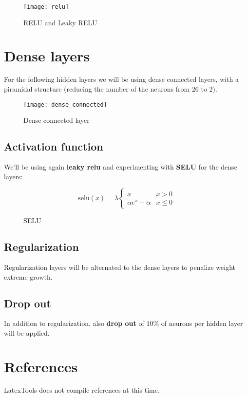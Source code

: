 \begin{figure}
	\texttt{[image: relu]}
	\caption{RELU and Leaky RELU}
\end{figure}

\chapter{Dense layers}
For the following hidden layers we will be using dense connected layers, with a piramidal structure (reducing the number of the neurons from 26 to 2).

\begin{figure}
	\texttt{[image: dense\_connected]}
	\caption{Dense connected layer}
\end{figure}

\section{Activation function}
We'll be using again \textbf{leaky relu} and experimenting with \textbf{SELU} for the dense layers:

\begin{figure}
	\[
		\text{selu}(x) = \lambda \begin{cases}
			x                 & x > 0    \\
			\alpha e^x-\alpha & x \leq 0
		\end{cases}
	\]
	\caption{SELU}
\end{figure}

\section{Regularization}
Regularization layers will be alternated to the dense layers to penalize weight extreme growth.

\section{Drop out}
In addition to regularization, also \textbf{drop out} of \(10\% \) of neurons per hidden layer will be applied.



\chapter{References}
LatexTools does not compile references at this time.

